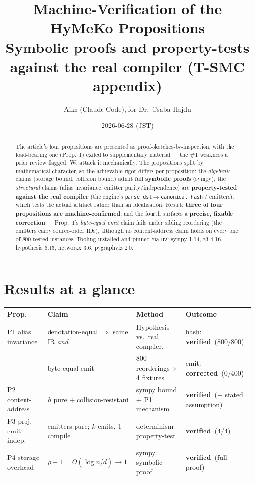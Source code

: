 \documentclass[11pt]{article}
\title{\textbf{Machine-Verification of the HyMeKo Propositions}\\[2pt]
\large Symbolic proofs and property-tests against the real compiler (T-SMC appendix)}
\author{Aiko (Claude Code), for Dr.\ Csaba Hajdu}
\date{2026-06-28 (JST)}
\newcommand{\yes}{\textcolor{green!55!black}{\textbf{verified}}}
\newcommand{\corr}{\textcolor{orange!85!black}{\textbf{corrected}}}
\begin{document}
\maketitle

\begin{abstract}
\noindent The article's four propositions are presented as proof-sketches-by-inspection, with the load-bearing
one (Prop.~1) exiled to supplementary material --- the \#1 weakness a prior review flagged. We attack it
mechanically. The propositions split by mathematical character, so the achievable rigor differs per proposition:
the \emph{algebraic} claims (storage bound, collision bound) admit full \textbf{symbolic proofs} (\textsf{sympy});
the \emph{structural} claims (alias invariance, emitter purity/independence) are \textbf{property-tested against
the real compiler} (the engine's \texttt{parse\_dsl}$\to$\texttt{canonical\_hash} / emitters), which tests the
actual artifact rather than an idealisation. Result: \textbf{three of four propositions are machine-confirmed},
and the fourth surfaces a \textbf{precise, fixable correction} --- Prop.~1's \emph{byte-equal emit} claim fails
under sibling reordering (the emitters carry source-order IDs), although its content-address claim holds on every
one of 800 tested instances. Tooling installed and pinned via \texttt{uv}: \textsf{sympy 1.14, z3 4.16,
hypothesis 6.15, networkx 3.6, pygraphviz 2.0}.
\end{abstract}

\section{Results at a glance}
\begin{table}[h]
\centering
\small
\begin{tabular}{llll}
\toprule
Prop. & Claim & Method & Outcome \\
\midrule
P1 alias invariance & denotation-equal $\Rightarrow$ same IR \emph{and} & Hypothesis vs.\ real compiler, & hash: \yes\ (800/800)\\
 & byte-equal emit & 800 reorderings $\times$ 4 fixtures & emit: \corr\ (0/400)\\
P2 content-address & $h$ pure + collision-resistant & \textsf{sympy} bound + P1 mechanism & \yes\ (+ stated assumption)\\
P3 proj.--emit indep. & emitters pure; $k$ emits, 1 compile & determinism property-test & \yes\ (4/4)\\
P4 storage overhead & $\rho-1=O(\log n/\bar d)\to 1$ & \textsf{sympy} symbolic proof & \yes\ (full proof)\\
\bottomrule
\end{tabular}
\end{table}
\end{document}
